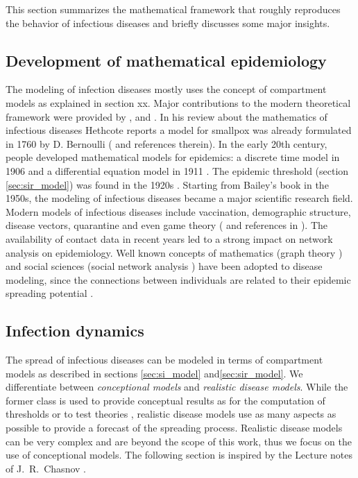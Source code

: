 \documentclass[openright,twoside,headsepline]{scrbook}
\begin{document}
This section summarizes the mathematical framework that roughly reproduces the behavior of infectious diseases and briefly discusses some major insights.

\subsection{Development of mathematical epidemiology}
The modeling of infection diseases mostly uses the concept of compartment models as explained in section xx.
Major contributions to the modern theoretical framework were provided by \citep{kermack:27}, \citep{bailey:57} and \citep{andersonmay:92}.
In his review about the mathematics of infectious diseases Hethcote reports a model for smallpox was already formulated in 1760 by D. Bernoulli (\citep{Hethcote:2000} and references therein).
In the early 20th century, people developed mathematical models for epidemics: a discrete time model in 1906 \citep{Hamer} and a differential equation model in 1911 \citep{Ross}.
The epidemic threshold (section \ref{sec:sir_model}) was found in the 1920s \citep{kermack:27}.
Starting from Bailey's book \citep{bailey:57} in the 1950s, the modeling of infectious diseases became a major scientific research field.
Modern models of infectious diseases include vaccination, demographic structure, disease vectors, quarantine and even game theory (\citep{Bauch:2004} and references in \citep{Hethcote:2000}).
The availability of contact data in recent years led to a strong impact on network analysis on epidemiology.
Well known concepts of mathematics (graph theory \citep{Bollobas:1985}) and social sciences (social network analysis \citep{WassermanFaust}) have been adopted to disease modeling, since the connections between individuals are related to their epidemic spreading potential \citep{Keeling:2005}.

\subsection{Infection dynamics}
The spread of infectious diseases can be modeled in terms of compartment models as described in sections \ref{sec:si_model} and\ref{sec:sir_model}.
We differentiate between \emph{conceptional models} and \emph{realistic disease models}.
While the former class is used to provide conceptual results as for the computation of thresholds or to test theories \citep{Hethcote:2000}, realistic disease models use as many aspects as possible to provide a forecast of the spreading process.
Realistic disease models can be very complex and are beyond the scope of this work, thus we focus on the use of conceptional models.
The following section is inspired by the Lecture notes of J.~R.~Chasnov \citep{Chasnov:2010}.
\end{document}
